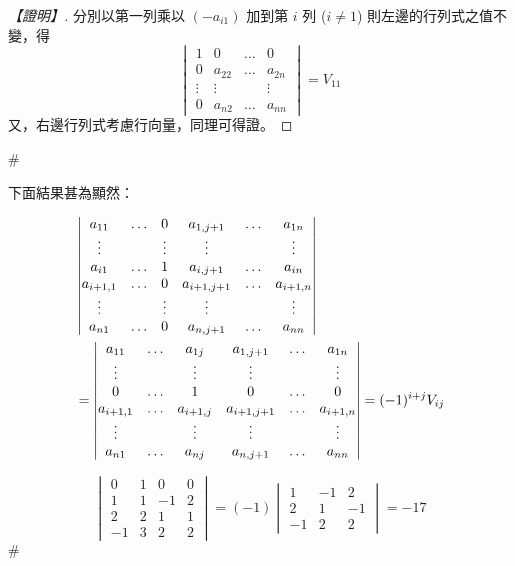 \begin{proof}[【證明】]
分別以第一列乘以 $(-a_{i1})$ 加到第 $i$ 列 ($i \ne 1$) 則左邊的行列式之值不變，得
\[ \begin{vmatrix}
1 & 0 & \dots & 0 \\
0 & a_{22} & \dots & a_{2n} \\
\vdots & \vdots & & \vdots \\
0 & a_{n2} & \dots & a_{nn}
\end{vmatrix} = V_{11} \]
又，右邊行列式考慮行向量，同理可得證。
\end{proof}\hfill$\#$

下面結果甚為顯然：

\begin{corollary}\label{cor:b6s-1-4}
\begin{align}
&\begin{vmatrix}
a_{11} & \dots & 0 & a_{1,j+1} & \dots & a_{1n} \\
\vdots & & \vdots & \vdots & & \vdots \\
a_{i1} & \dots & 1 & a_{i,j+1} & \dots & a_{in} \\
a_{i+1,1} & \dots & 0 & a_{i+1,j+1} & \dots & a_{i+1,n} \\
\vdots & & \vdots & \vdots & & \vdots \\
a_{n1} & \dots & 0 & a_{n,j+1} & \dots & a_{nn}
\end{vmatrix} \notag \\
&= \begin{vmatrix}
a_{11} & \dots & a_{1j} & a_{1,j+1} & \dots & a_{1n} \\
\vdots & & \vdots & \vdots & & \vdots \\
0 & \dots & 1 & 0 & \dots & 0 \\
a_{i+1,1} & \dots & a_{i+1,j} & a_{i+1,j+1} & \dots & a_{i+1,n} \\
\vdots & & \vdots & \vdots & & \vdots \\
a_{n1} & \dots & a_{nj} & a_{n,j+1} & \dots & a_{nn}
\end{vmatrix} = (-1)^{i+j} V_{ij} \label{eq:b6s-1-6-14}
\end{align}
\end{corollary}

\begin{example}\label{ex:b6s-1-28}
\[ \begin{vmatrix}
0 & 1 & 0 & 0 \\
1 & 1 & -1 & 2 \\
2 & 2 & 1 & 1 \\
-1 & 3 & 2 & 2
\end{vmatrix} = (-1) \begin{vmatrix}
1 & -1 & 2 \\
2 & 1 & -1 \\
-1 & 2 & 2
\end{vmatrix} = -17 \]\hfill$\#$
\end{example}

